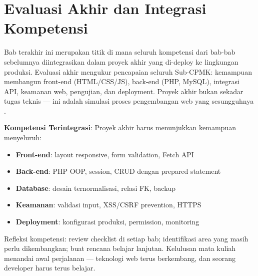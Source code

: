 \section{Evaluasi Akhir dan Integrasi Kompetensi}

Bab terakhir ini merupakan titik di mana seluruh kompetensi dari bab-bab sebelumnya diintegrasikan dalam proyek akhir yang di-deploy ke lingkungan produksi. Evaluasi akhir mengukur pencapaian seluruh Sub-CPMK: kemampuan membangun front-end (HTML/CSS/JS), back-end (PHP, MySQL), integrasi API, keamanan web, pengujian, dan deployment. Proyek akhir bukan sekadar tugas teknis --- ini adalah simulasi proses pengembangan web yang sesungguhnya \cite{mdnDeploy}.

\begin{konsep}
\textbf{Kompetensi Terintegrasi}: Proyek akhir harus menunjukkan kemampuan menyeluruh:
\begin{itemize}
  \item \textbf{Front-end}: layout responsive, form validation, Fetch API
  \item \textbf{Back-end}: PHP OOP, session, CRUD dengan prepared statement
  \item \textbf{Database}: desain ternormalisasi, relasi FK, backup
  \item \textbf{Keamanan}: validasi input, XSS/CSRF prevention, HTTPS
  \item \textbf{Deployment}: konfigurasi produksi, permission, monitoring
\end{itemize}
\end{konsep}

Refleksi kompetensi: review checklist di setiap bab; identifikasi area yang masih perlu dikembangkan; buat rencana belajar lanjutan. Kelulusan mata kuliah menandai awal perjalanan --- teknologi web terus berkembang, dan seorang developer harus terus belajar.

